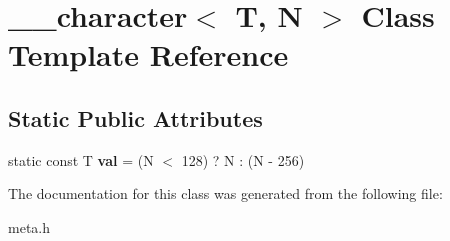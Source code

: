 \hypertarget{class____character}{\section{\+\_\+\+\_\+character$<$ T, N $>$ Class Template Reference}
\label{class____character}
}
\subsection*{Static Public Attributes}
\begin{DoxyCompactItemize}
\item 
\hypertarget{class____character_a03ed18a99c16c3a1a009f622888c711d}{static const T {\bfseries val} = (N $<$ 128) ? N \+: (N -\/ 256)}\label{class____character_a03ed18a99c16c3a1a009f622888c711d}

\end{DoxyCompactItemize}


The documentation for this class was generated from the following file\+:\begin{DoxyCompactItemize}
\item 
meta.\+h\end{DoxyCompactItemize}

